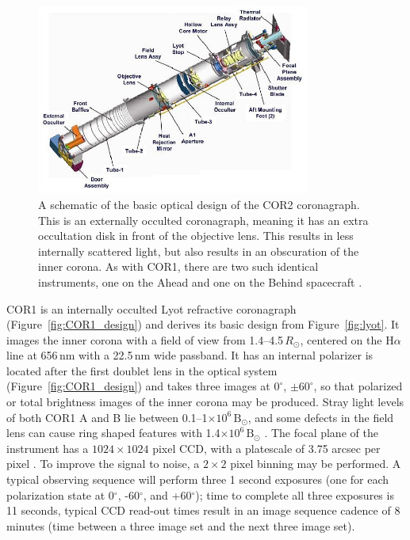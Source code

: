 \begin{figure}[!t]
\begin{center}
\includegraphics[width=0.8\textwidth]{images/cor2}
\caption[The COR2 coronagraph]{A schematic of the basic optical design of the COR2 coronagraph. This is an externally occulted coronagraph, meaning it has an extra occultation disk in front of the objective lens. This results in less internally scattered light, but also results in an obscuration of the inner corona. As with COR1, there are two such identical instruments, one on the Ahead and one on the Behind spacecraft \citep{how08}.}
\label{fig:cor2}
\end{center}
\end{figure}


COR1 is an internally occulted Lyot refractive coronagraph (Figure~\ref{fig:COR1_design}) and derives its basic design from Figure~\ref{fig:lyot}. It images the inner corona with a field of view from 1.4--4.5\,$R_{\odot}$, centered on the H$\alpha$ line at 656\,nm with a 22.5\,nm wide passband. 
It has an internal polarizer is located after the first doublet lens in the optical system (Figure~\ref{fig:COR1_design}) and takes three images at $0^{\circ}$, $\pm60^{\circ}$, so that polarized or total brightness images of the inner corona may be produced. Stray light levels of both COR1 A and B lie between 0.1--1$\times10^6\,\mathrm{B}_{\odot}$, and some defects in the field lens can cause ring shaped features with 1.4$\times10^6\,\mathrm{B}_{\odot}$ \citep{how08}. The focal plane of the instrument has a $1024\times1024$ pixel CCD, with a platescale of 3.75 arcsec per pixel \citep{thomp2008}. To improve the signal to noise, a $2\times2$ pixel binning may be performed. A typical observing sequence will perform three 1 second exposures (one for each polarization state at 0$^{\circ}$, -60$^{\circ}$, and +60$^{\circ}$); time to complete all three exposures is 11 seconds, typical CCD read-out times result in an image sequence cadence of 8 minutes (time between a three image set and the next three image set).

